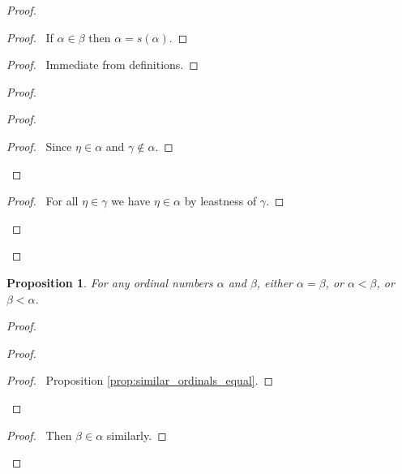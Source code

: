 \documentclass{report}
\let\qed\relax
\newtheorem{prop}[ax]{Proposition}
\theoremstyle{definition}
\begin{document}
\begin{proof}
\pf
{}
\begin{proof}
	\pf\ If $\alpha \in \beta$ then $\alpha = s(\alpha)$.
\end{proof}
\begin{proof}
	\pf\ Immediate from definitions.
\end{proof}
\begin{proof}
	\begin{proof}
		\begin{proof}
			\pf\ Since $\eta \in \alpha$ and $\gamma \notin \alpha$.
		\end{proof}
	\end{proof}
	\begin{proof}
		\pf\ For all $\eta \in \gamma$ we have $\eta \in \alpha$ by leastness of $\gamma$.
	\end{proof}
\end{proof}
\qed
\end{proof}

\begin{prop}
For any ordinal numbers $\alpha$ and $\beta$, either $\alpha = \beta$, or $\alpha < \beta$, or $\beta < \alpha$.
\end{prop}

\begin{proof}
\pf
{}
\begin{proof}
	\begin{proof}
		\pf\ Proposition \ref{prop:similar_ordinals_equal}.
	\end{proof}
\end{proof}
\begin{proof}
	\pf\ Then $\beta \in \alpha$ similarly.
\end{proof}
\qed
\end{proof}
\end{document}
